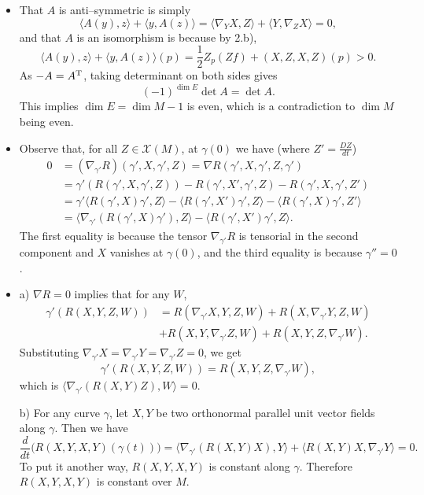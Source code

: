 \begin{itemize}
    \item[3.] That $A$ is anti--symmetric is simply
    \[\langle A(y),z \rangle+\langle y,A(z) \rangle
    =\langle \nabla_YX,Z \rangle+\langle Y,\nabla_ZX \rangle=0,\]
    and that $A$ is an isomorphism is because by 2.b),
    \[\langle A(y),z \rangle+\langle y,A(z) \rangle(p)
    =\frac{1}{2}Z_p(Zf)+(X,Z,X,Z)(p)>0.\]
    As $-A=A^{\rm T}$, taking determinant on both sides gives
    \[(-1)^{\dim E}\det A=\det A.\]
    This implies $\dim E=\dim M-1$ is even, 
    which is a contradiction to $\dim M$ being even.

    \item[5.] Observe that, for all $Z\in\mathscr{X}(M)$, 
    at $\gamma(0)$ we have (where $Z'=\frac{DZ}{dt}$)
    \begin{align*}
        0&=(\nabla_{\gamma'}R)(\gamma',X,\gamma',Z)
        =\nabla R(\gamma',X,\gamma',Z,\gamma')\\
        &=\gamma'(R(\gamma',X,\gamma',Z))
        -R(\gamma',X',\gamma',Z)-R(\gamma',X,\gamma',Z')\\
        &=\gamma'\langle R(\gamma',X)\gamma',Z\rangle
        -\langle R(\gamma',X')\gamma',Z\rangle
        -\langle R(\gamma',X)\gamma',Z'\rangle\\
        &=\langle\nabla_{\gamma'}(R(\gamma',X)\gamma'),Z\rangle
        -\langle R(\gamma',X')\gamma',Z\rangle.
    \end{align*}
    The first equality is because the tensor $\nabla_{\gamma'}R$ 
    is tensorial in the second component and $X$ vanishes at $\gamma(0)$, 
    and the third equality is because $\gamma''=0$.

    \item[6.] a) $\nabla R=0$ implies that for any $W$,
    \begin{align*}
        \gamma'(R(X,Y,Z,W))
        &=R(\nabla_{\gamma'}X,Y,Z,W)+R(X,\nabla_{\gamma'}Y,Z,W)\\
        &+R(X,Y,\nabla_{\gamma'}Z,W)+R(X,Y,Z,\nabla_{\gamma'}W).
    \end{align*}
    Substituting $\nabla_{\gamma'}X=\nabla_{\gamma'}Y=\nabla_{\gamma'}Z=0$, we get
    \[\gamma'(R(X,Y,Z,W))=R(X,Y,Z,\nabla_{\gamma'}W),\]
    which is $\langle\nabla_{\gamma'}(R(X,Y)Z),W\rangle=0$.

    b) For any curve $\gamma$, let $X,Y$ be two orthonormal 
    parallel unit vector fields along $\gamma$. Then we have
    \[\frac{d}{dt}\big(R(X,Y,X,Y)(\gamma(t))\big)
    =\langle\nabla_{\gamma'}(R(X,Y)X),Y\rangle
    +\langle R(X,Y)X,\nabla_{\gamma'}Y\rangle=0.\]
    To put it another way, $R(X,Y,X,Y)$ is constant along $\gamma$. 
    Therefore $R(X,Y,X,Y)$ is constant over $M$.


\end{itemize}
